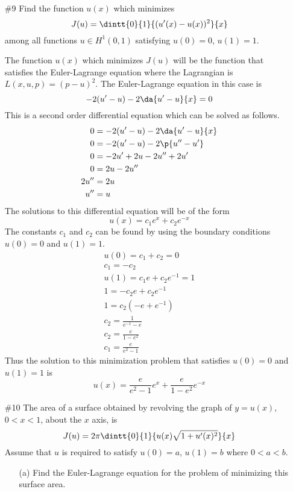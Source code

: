 \documentclass[11pt, oneside]{article}
\begin{document}
\begin{enumerate}
  \pagebreak
  \item[\#9] %
    Find the function $u(x)$ which minimizes
    \[
      J(u) = \dintt{0}{1}{(u'(x) - u(x))^2}{x}
    \]
    among all functions $u \in H^1(0, 1)$ satisfying $u(0) = 0$, $u(1) = 1$.

    The function $u(x)$ which minimizes $J(u)$ will be the function that
    satisfies the Euler-Lagrange equation where the Lagrangian is
    $L(x, u, p) = (p - u)^2$.
    The Euler-Lagrange equation in this case is
    \[
      -2(u' - u) - 2\da{u' - u}{x} = 0
    \]
    This is a second order differential equation which can be solved as follows.
    \begin{align*}
      0 &= -2(u' - u) - 2\da{u' - u}{x} \\
      0 &= -2(u' - u) - 2\p{u'' - u'} \\
      0 &= -2u' + 2u - 2u'' + 2u' \\
      0 &= 2u - 2u'' \\
      2u'' &= 2u \\
      u'' &= u \\
    \end{align*}
    The solutions to this differential equation will be of the form
    \[
      u(x) = c_1 e^x + c_2 e^{-x}
    \]
    The constants $c_1$ and $c_2$ can be found by using the boundary conditions
    $u(0) = 0$ and $u(1) = 1$.
    \begin{align*}
      u(0) = c_1 + c_2 = 0 \\
      c_1 = -c_2 \\
      u(1) = c_1 e + c_2 e^{-1} = 1\\
      1 = -c_2 e + c_2 e^{-1} \\
      1 = c_2(-e + e^{-1}) \\
      c_2 = \frac{1}{e^{-1} - e} \\
      c_2 = \frac{e}{1 - e^2} \\
      c_1 = \frac{e}{e^2 - 1}
    \end{align*}
    Thus the solution to this minimization problem that satisfies $u(0) = 0$ and
    $u(1) = 1$ is
    \[
      u(x) = \frac{e}{e^2 - 1} e^x + \frac{e}{1 - e^2} e^{-x}
    \]

  \pagebreak
  \item[\#10]
    The area of a surface obtained by revolving the graph of $y = u(x)$,
    $0 < x < 1$, about the $x$ axis, is
    \[
      J(u) = 2\pi \dintt{0}{1}{u(x) \sqrt{1 + u'(x)^2}}{x}
    \]
    Assume that $u$ is required to satisfy $u(0) = a$, $u(1) = b$ where
    $0 < a < b$.
    \begin{enumerate}
      \item[(a)] %
        Find the Euler-Lagrange equation for the problem of minimizing this surface area.


\end{enumerate}
\end{enumerate}
\end{document}
